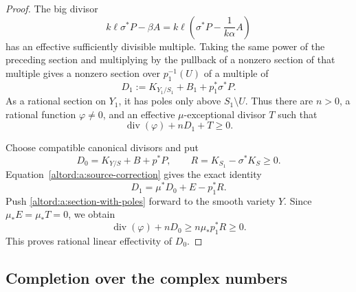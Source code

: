 \begin{proof}
The big divisor
\[
 k\ell\sigma^*P-\beta A
   =k\ell\left(\sigma^*P-\frac{1}{k\alpha}A\right)
\]
has an effective sufficiently divisible multiple.  Taking the
same power of the preceding section and multiplying by the
pullback of a nonzero section of that multiple gives a nonzero
section over \(p_1^{-1}(U)\) of a multiple of
\[
 D_1:=K_{Y_1/S_1}+B_1+p_1^*\sigma^*P.
\]
As a rational section on \(Y_1\), it has poles only above
\(S_1\setminus U\).  Thus there are \(n>0\), a rational function
\(\varphi\ne0\), and an effective \(\mu\)-exceptional divisor \(T\)
such that
\begin{equation}\label{altord:a:section-with-poles}
 \operatorname{div}(\varphi)+nD_1+T\geq0.
\end{equation}

Choose compatible canonical divisors and put
\[
 D_0=K_{Y/S}+B+p^*P,\qquad
 R=K_{S_1}-\sigma^*K_S\geq0.
\]
Equation~\eqref{altord:a:source-correction} gives the exact identity
\[
 D_1=\mu^*D_0+E-p_1^*R.
\]
Push \eqref{altord:a:section-with-poles} forward to the smooth variety
\(Y\).  Since \(\mu_*E=\mu_*T=0\), we obtain
\[
 \operatorname{div}(\varphi)+nD_0
      \geq n\mu_*p_1^*R\geq0.
\]
This proves rational linear effectivity of \(D_0\).
\end{proof}

\subsection{Completion over the complex numbers}

